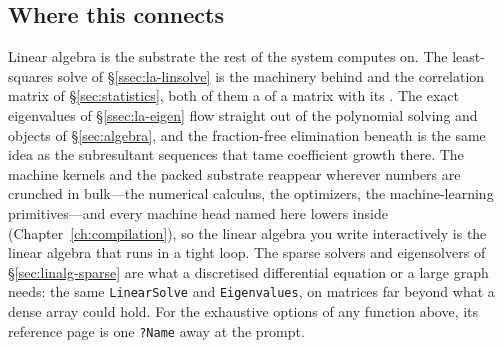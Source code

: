 \subsection*{Where this connects}

Linear algebra is the substrate the rest of the system computes on. The
least-squares solve of \S\ref{ssec:la-linsolve} is the machinery behind 
and the correlation matrix of \S\ref{sec:statistics}, both of them a  of a
matrix with its . The exact eigenvalues of \S\ref{ssec:la-eigen} flow
straight out of the polynomial solving and  objects of \S\ref{sec:algebra},
and the fraction-free elimination beneath  is the same idea as the
subresultant sequences that tame coefficient growth there. The machine kernels and
the packed substrate reappear wherever numbers are crunched in bulk---the numerical
calculus, the optimizers, the machine-learning primitives---and every machine head
named here lowers inside  (Chapter~\ref{ch:compilation}), so the
linear algebra you write interactively is the linear algebra that runs in a tight
loop. The sparse solvers and eigensolvers of \S\ref{sec:linalg-sparse} are what a
discretised differential equation or a large graph needs: the same
\texttt{LinearSolve} and \texttt{Eigenvalues}, on matrices far beyond what a dense
array could hold. For the exhaustive options of any function above, its reference page is one
\texttt{?Name} away at the prompt.
